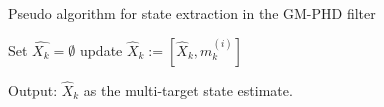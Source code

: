 \begin{algorithm}
    \caption{Pseudo algorithm for state extraction in the GM-PHD filter}
    \begin{algorithmic}[1]

        \State Set $\hat{X_k} = \emptyset$
                    \State update $\hat{X}_k := [\hat{X}_k, m_k^{(i)}]$
                \EndFor
            \EndIf
        \EndFor

        \State Output: $\hat{X}_k$ as the multi-target state estimate.
    \end{algorithmic}
    \label{alg:phd_state_extraction}
\end{algorithm}





